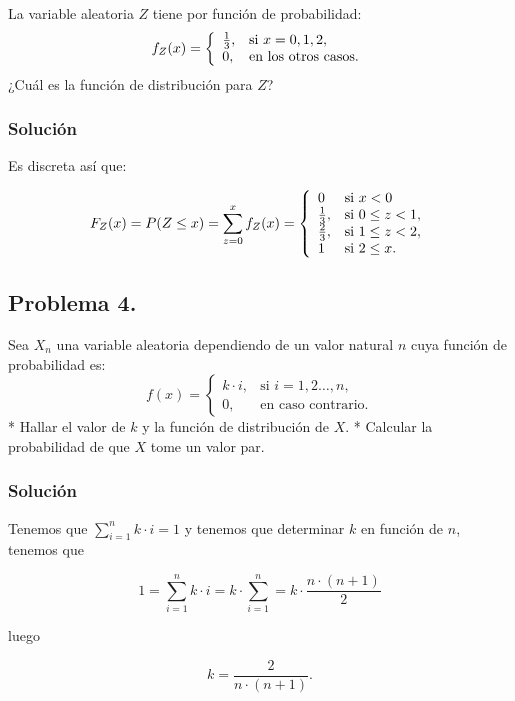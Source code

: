 \documentclass[
]{article}
\begin{document}
La variable aleatoria \(Z\) tiene por función de probabilidad:
\[f_Z (x)=
\left\{\begin{array}{ll}
{1\over 3}, & \mbox{si $x=0,1,2$},\\ 0, & \mbox{en los otros
casos.}
\end{array}\right.
\] ¿Cuál es la función de distribución para \(Z\)?

\hypertarget{soluciuxf3n-2}{%
\subsubsection{Solución}\label{soluciuxf3n-2}}

Es discreta así que:

\[F_Z(x)=P(Z\leq x)= \sum_{z=0}^x f_Z (x)=
\left\{\begin{array}{ll}
0 & \mbox{si }  x<0 \\
{1\over 3}, & \mbox{si } 0\leq z< 1,\\ 
{2\over 3}, & \mbox{si } 1\leq z< 2,\\ 
1 & \mbox{si }  2 \leq x.
\end{array}\right.
\]

\hypertarget{problema-4.}{%
\subsection{Problema 4.}\label{problema-4.}}

Sea \(X_n\) una variable aleatoria dependiendo de un valor natural \(n\)
cuya función de probabilidad es: \[
f(x)=\begin{cases}
k\cdot i, & \mbox{si }i=1,2\ldots,n, \\
0, & \mbox{en caso contrario.}
\end{cases}
\] * Hallar el valor de \(k\) y la función de distribución de \(X\). *
Calcular la probabilidad de que \(X\) tome un valor par.

\hypertarget{soluciuxf3n-3}{%
\subsubsection{Solución}\label{soluciuxf3n-3}}

Tenemos que \(\sum_{i=1}^n k\cdot i=1\) y tenemos que determinar \(k\)
en función de \(n\), tenemos que

\[
1=\sum_{i=1}^n k\cdot i= k\cdot \sum_{i=1}^n = k\cdot \frac{n\cdot (n+1)}{2}
\]

luego

\[k= \frac{2}{n\cdot (n+1)}.\]
\end{document}
